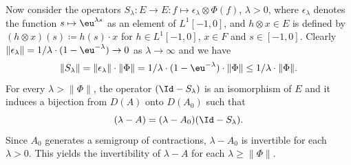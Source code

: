 Now consider the operators $S_{\lambda} \colon E \to E \colon f \mapsto \epsilon_{\lambda} \otimes \Phi(f)$, $\lambda > 0$, where $\epsilon_{\lambda}$ denotes the function $s \mapsto \eu^{\lambda s}$ as an element of\/ $L^{1}[-1,0]$, 
and $h \otimes x \in E$ is defined by 
$(h \otimes x)(s) \coloneq h(s) \cdot x$ for $h \in L^{1}[-1,0]$, $x \in F$ and $s \in [-1,0]$.
Clearly 
$\|\epsilon_{\lambda}\| = 1/\lambda \cdot (1 - \eu^{-\lambda}) \to 0$ as $\lambda \to \infty$ and we have
\[
\|S_{\lambda}\| = \|\epsilon_{\lambda}\| \cdot \|\Phi\| = 1/\lambda \cdot (1 - \eu^{-\lambda}) \cdot \|\Phi\| \leq 1/\lambda \cdot \|\Phi\| .
\]
For every $\lambda > \|\Phi\|$, the operator $(\Id - S_{\lambda})$ is an isomorphism of\/ $E$ and it induces a bijection from $D(A)$ onto $D(A_{0})$ such that
\begin{equation}\label{eq:c4-3.2}
(\lambda - A) = (\lambda - A_{0})(\Id - S_{\lambda}).
\end{equation}
Since $A_{0}$ generates a semigroup of contractions, $\lambda - A_{0}$ is invertible for each $\lambda > 0$.
This yields the invertibility of\/ $\lambda - A$ for each $\lambda \geq \|\Phi\|$.

